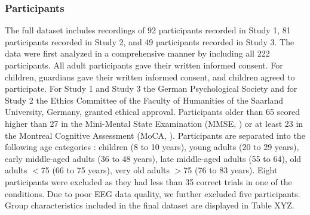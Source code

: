 \subsubsection{Participants}
\label{methods:datasets:II:participants}
The full dataset includes recordings of 92 participants recorded in Study 1, 81 participants recorded in Study 2, and 49 participants recorded in Study 3. The data were first analyzed in a comprehensive manner by \citeauthor{Reuter2019} \cite{Reuter2019} including all 222 participants. All adult participants gave their written informed consent. For children, guardians gave their written informed consent, and children agreed to participate. For Study 1 and Study 3 the German Psychological Society and for Study 2 the Ethics Committee of the Faculty of Humanities of the Saarland University, Germany, granted ethical approval. Participants older than 65 scored higher than 27 in the Mini-Mental State Examination (MMSE, \cite{Folstein1975}) or at least 23 in the Montreal Cognitive Assessment (MoCA, \cite{Julayanont2017, Nasreddine2005}). Participants are separated into the following age categories \cite{Reuter2019}: children (8 to 10 years), young adults (20 to 29 years), early middle-aged adults (36 to 48 years), late middle-aged adults (55 to 64), old adults $<$75 (66 to 75 years), very old adults $>$75 (76 to 83 years). Eight participants were excluded as they had less than 35 correct trials in one of the conditions. Due to poor EEG data quality, we further excluded five participants. Group characteristics included in the final dataset are displayed in Table XYZ.

